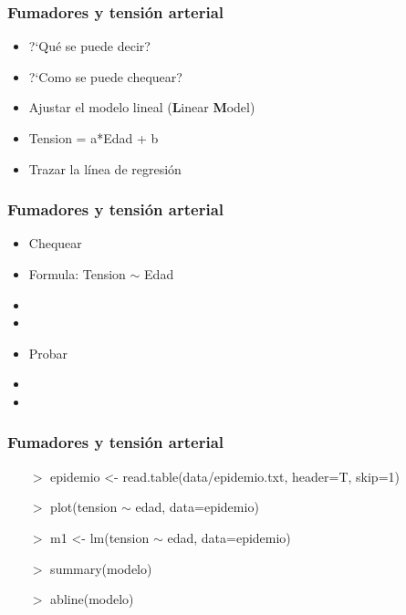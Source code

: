 \documentclass[mathserif]{beamer}
\begin{document}
\begin{frame}[plain,label=d49]%
\frametitle{Fumadores y tensi\'on arterial}
\begin{itemize}
   \item ?`Qu\'e se puede decir?
   \item ?`Como se puede chequear?
   \item Ajustar el modelo lineal (\textbf{L}inear \textbf{M}odel)
   \item Tension = a*Edad + b
   \item Trazar la l\'inea de regresi\'on
\end{itemize}
\end{frame}%

\begin{frame}[plain,label=d50]%
\frametitle{Fumadores y tensi\'on arterial}
\begin{itemize}
   \item Chequear 
   \item Formula: Tension $\sim$ Edad
   \item {}
   \item {}
   \item Probar 
   \item {}
   \item {}
\end{itemize}
\end{frame}%

\begin{frame}[plain,label=d52]%
\frametitle{Fumadores y tensi\'on arterial}
\begin{semiverbatim}
\begin{itemize}
   \item[$>$] epidemio <- read.table(data/epidemio.txt, header=T, skip=1)
   \item[$>$] plot(tension $\sim$ edad, data=epidemio)
   \item[$>$] m1 <- lm(tension $\sim$ edad, data=epidemio)
   \item[$>$] summary(modelo)
   \item[$>$] abline(modelo)
\end{itemize}
\end{semiverbatim}
\end{frame}%
\end{document}
